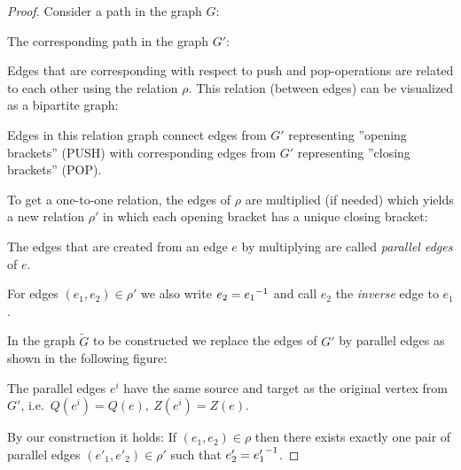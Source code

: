 \begin{proof}
Consider a path in the graph $G$:

\begin{center}

\end{center}

The corresponding path in the graph $G'$:

\begin{center}

\end{center}

Edges that are corresponding with respect to push and pop-operations are related
to each other using the relation $\rho$. This relation (between edges) can be
visualized as a bipartite graph:

\begin{center}

\end{center}

Edges in this relation graph connect edges from $G'$ representing ''opening
brackets'' (PUSH) with corresponding edges from $G'$ representing
''closing brackets'' (POP).

To get a one-to-one relation, the edges of $\rho$ are multiplied (if
needed) which yields a new relation $\rho'$ in which each opening bracket has a
unique closing bracket:

\begin{center}

\end{center}

The edges that are created from an edge $e$ by multiplying are called {\em
parallel edges} of $e$.

For edges $(e_1, e_2) \in \rho'$ we also write $e_2 = \mbox{${e_1}^{-1}$}$ and call $e_2$
the {\em inverse} edge to $e_1$.

In the graph $\tilde{G}$ to be constructed we replace the edges of $G'$ by
parallel edges as shown in the following figure:

\begin{center}

\end{center}

The parallel edges $e^{i}$ have the same source and target as the original
vertex from $G'$, i.e.\ $Q(e^{i}) = Q(e),\ Z(e^{i}) = Z(e)$.

By our construction it holds:
If $(e_1, e_2) \in \rho$ then there exists exactly one pair of parallel edges $(e'_1, e'_2)  \in \rho'$ such that $e'_2 =
\mbox{${e'_1}^{-1}$}$.


\end{proof}
